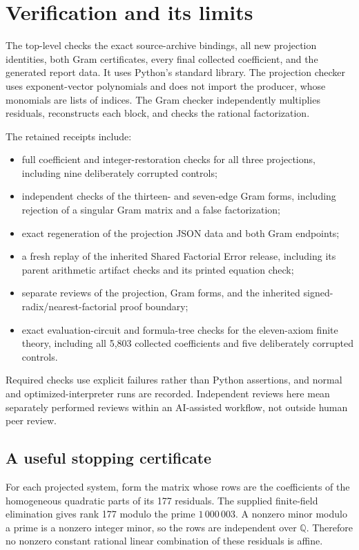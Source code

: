 \documentclass[11pt]{article}
\theoremstyle{remark}\newtheorem{remark}[theorem]{Remark}
\newcommand{\Q}{\mathbb Q}
\newcommand{\code}[1]{\texttt{\detokenize{#1}}}
\begin{document}
\section{Verification and its limits}\label{sec:verification}

The top-level \code{verify.py} checks the exact source-archive bindings,
all new projection identities, both Gram certificates, every final
collected coefficient, and the generated report data. It uses Python's
standard library. The projection checker uses exponent-vector
polynomials and does not import the producer, whose monomials are lists
of indices. The Gram checker independently multiplies residuals,
reconstructs each block, and checks the rational factorization.

The retained receipts include:
\begin{itemize}
\item full coefficient and integer-restoration checks for all three
      projections, including nine deliberately corrupted controls;
\item independent checks of the thirteen- and seven-edge Gram forms,
      including rejection of a singular Gram matrix and a false
      factorization;
\item exact regeneration of the projection JSON data and both Gram
      endpoints;
\item a fresh replay of the inherited Shared Factorial Error release,
      including its parent arithmetic artifact checks and its printed
      equation check;
\item separate reviews of the projection, Gram forms, and the
      inherited signed-radix/nearest-factorial proof boundary;
\item exact evaluation-circuit and formula-tree checks for the
      eleven-axiom finite theory, including all 5,803 collected
      coefficients and five deliberately corrupted controls.
\end{itemize}

Required checks use explicit failures rather than Python assertions, and
normal and optimized-interpreter runs are recorded. Independent reviews
here mean separately performed reviews within an AI-assisted workflow,
not outside human peer review.

\subsection{A useful stopping certificate}

For each projected system, form the matrix whose rows are the
coefficients of the homogeneous quadratic parts of its 177 residuals.
The supplied finite-field elimination gives rank 177 modulo the prime
$1\,000\,003$. A nonzero minor modulo a prime is a nonzero integer
minor, so the rows are independent over $\Q$. Therefore no nonzero
constant rational linear combination of these residuals is affine.
\end{document}
